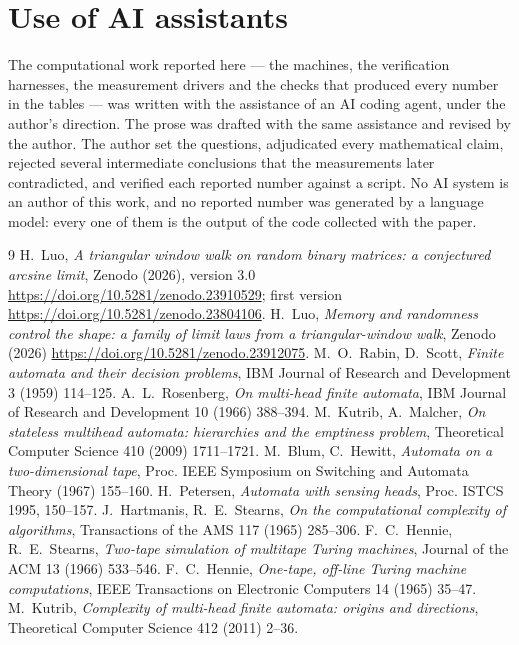 \documentclass[11pt]{article}
\theoremstyle{remark}
\begin{document}
\section*{Use of AI assistants}

The computational work reported here --- the machines, the verification harnesses, the measurement
drivers and the checks that produced every number in the tables --- was written with the assistance
of an AI coding agent, under the author's direction. The prose was drafted with the same
assistance and revised by the author. The author set the questions, adjudicated every mathematical
claim, rejected several intermediate conclusions that the measurements later contradicted, and
verified each reported number against a script. No AI system is an author of this work, and no
reported number was generated by a language model: every one of them is the output of the code
collected with the paper.


\begin{thebibliography}{9}
 H.~Luo, \emph{A triangular window walk on random binary matrices: a
conjectured arcsine limit}, Zenodo (2026), version 3.0
\url{https://doi.org/10.5281/zenodo.23910529}; first version \url{https://doi.org/10.5281/zenodo.23804106}.
 H.~Luo, \emph{Memory and randomness control the shape: a family of
limit laws from a triangular-window walk}, Zenodo (2026)
\url{https://doi.org/10.5281/zenodo.23912075}.
 M.~O.~Rabin, D.~Scott, \emph{Finite automata and their
decision problems}, IBM Journal of Research and Development 3 (1959) 114--125.
 A.~L.~Rosenberg, \emph{On multi-head finite automata}, IBM
Journal of Research and Development 10 (1966) 388--394.
 M.~Kutrib, A.~Malcher, \emph{On stateless
multihead automata: hierarchies and the emptiness problem}, Theoretical Computer Science 410 (2009)
1711--1721.
 M.~Blum, C.~Hewitt, \emph{Automata on a two-dimensional
tape}, Proc. IEEE Symposium on Switching and Automata Theory (1967) 155--160.
 H.~Petersen, \emph{Automata with sensing heads}, Proc. ISTCS
1995, 150--157.
 J.~Hartmanis, R.~E.~Stearns, \emph{On the
computational complexity of algorithms}, Transactions of the AMS 117 (1965) 285--306.
 F.~C.~Hennie, R.~E.~Stearns, \emph{Two-tape simulation
of multitape Turing machines}, Journal of the ACM 13 (1966) 533--546.
 F.~C.~Hennie, \emph{One-tape, off-line Turing machine computations},
IEEE Transactions on Electronic Computers 14 (1965) 35--47.
 M.~Kutrib, \emph{Complexity of multi-head finite automata: origins and
directions}, Theoretical Computer Science 412 (2011) 2--36.
\end{thebibliography}

\clearpage
\appendix

\end{document}
